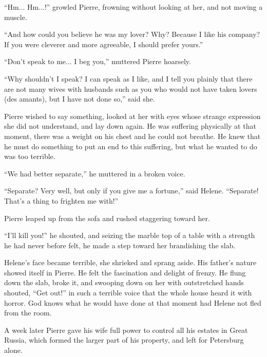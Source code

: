 ``Hm... Hm...!'' growled Pierre, frowning without looking at her,
and not moving a muscle.

``And how could you believe he was my lover? Why? Because I like
his company? If you were cleverer and more agreeable, I should
prefer yours.''

``Don't speak to me... I beg you,'' muttered Pierre hoarsely.

``Why shouldn't I speak? I can speak as I like, and I tell you
plainly that there are not many wives with husbands such as you
who would not have taken lovers (des amants), but I have not done
so,'' said she.

Pierre wished to say something, looked at her with eyes whose
strange expression she did not understand, and lay down again. He
was suffering physically at that moment, there was a weight on
his chest and he could not breathe. He knew that he must do
something to put an end to this suffering, but what he wanted to
do was too terrible.

``We had better separate,'' he muttered in a broken voice.

``Separate? Very well, but only if you give me a fortune,'' said
Helene.  ``Separate! That's a thing to frighten me with!''

Pierre leaped up from the sofa and rushed staggering toward her.

``I'll kill you!'' he shouted, and seizing the marble top of a
table with a strength he had never before felt, he made a step
toward her brandishing the slab.

Helene's face became terrible, she shrieked and sprang aside. His
father's nature showed itself in Pierre. He felt the fascination
and delight of frenzy. He flung down the slab, broke it, and
swooping down on her with outstretched hands shouted, ``Get
out!'' in such a terrible voice that the whole house heard it
with horror. God knows what he would have done at that moment had
Helene not fled from the room.

A week later Pierre gave his wife full power to control all his
estates in Great Russia, which formed the larger part of his
property, and left for Petersburg alone.


